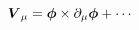 \begin{equation}
\mbox{\boldmath$V$}_\mu =\mbox{\boldmath$\phi$}\times \partial_\mu \mbox{\boldmath$\phi$}+\cdots
\end{equation}

